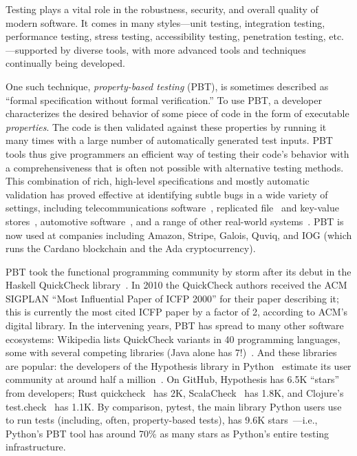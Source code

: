 Testing plays a vital role in the robustness, security, and overall
quality of modern software. It comes in many styles---unit testing,
integration testing, performance testing, stress testing,
accessibility testing, penetration testing, etc.---supported by
diverse tools, with more advanced tools and techniques continually
being developed.

One such technique, {\em property-based testing} (PBT),
is sometimes described as ``formal specification without formal
verification.''  To use PBT, a developer characterizes the desired behavior of
some piece of code in the form of executable {\em
  properties}. The code is
then validated against these properties by running it many times
with a large number of automatically generated test inputs.
%
PBT tools thus give programmers an efficient way of testing their
code's behavior with a comprehensiveness that is often not
possible with alternative testing methods. \iflater{}\fi
%
This combination of rich, high-level specifications and mostly
automatic validation has proved effective at identifying
subtle bugs in a wide variety of settings, including
telecommunications software~\cite{arts2006testing}, replicated
file~\cite{MysteriesOfDropbox2016} and key-value
stores~\cite{Bornholt2021}, automotive
software~\cite{arts2015testing}, and a range of other real-world
systems~\cite{hughes2016experiences}.
PBT is now used at companies including Amazon, Stripe, Galois, Quviq,
and IOG (which
runs the Cardano blockchain and the Ada cryptocurrency).

PBT took the functional programming community by storm after its
debut in the Haskell QuickCheck library~\cite{ClaessenHughes00}.  In
2010 the
QuickCheck authors received the ACM SIGPLAN ``Most Influential Paper of ICFP
2000'' for their paper describing it; this is currently the most cited
ICFP paper by
a factor of 2, according to ACM's digital library.  In the intervening
years, PBT has spread to many other software ecosystems:
%
Wikipedia lists QuickCheck variants in 40 programming languages, some
with several competing libraries (Java alone has
7!)~\cite{QuickCheckWikipedia}.
%
And these libraries are popular:
the developers of the Hypothesis library in
Python~\cite{maciver2019hypothesis,HypothesisGithub} estimate its user community
at around half a million~\cite{ZacPersonalCommunication,noauthor_python_nodate}.  On GitHub,
Hypothesis has 6.5K ``stars'' from developers; Rust
quickcheck~\cite{RustQuickcheckGithub} has 2K,
ScalaCheck~\cite{ScalaCheckGithub} has 1.8K, and Clojure's
test.check~\cite{ClojureTest.checkGithub} has 1.1K.
By comparison, pytest, the main library Python users use to run tests
(including, often, property-based tests), has 9.6K stars~\cite{PytestGitHub}---i.e., Python's
PBT tool has around 70\% as many stars as Python's entire testing
infrastructure.

